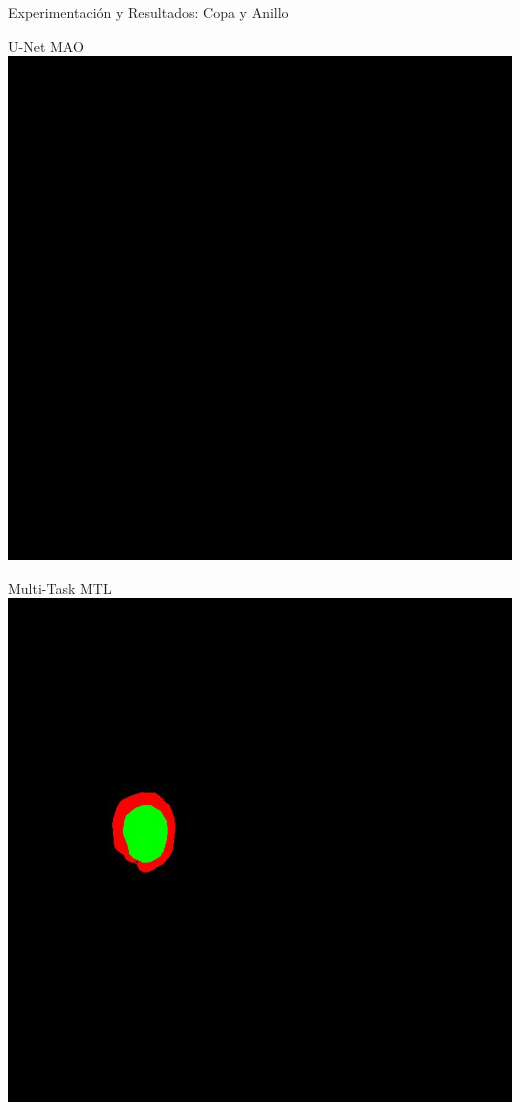 \documentclass[xcolor=dvipsnames,table]{beamer}
\begin{document}
\begin{frame}{Experimentación y Resultados: Copa y Anillo}
\begin{minipage}[b]{0.13\textwidth}
	\end{minipage}\hfill
	\begin{minipage}[b]{0.13\textwidth}
		\centering
		U-Net MAO\\[0.2cm]
		\includegraphics[width=\linewidth]{my_images/video/SOFTUNETMAO.jpg}
	\end{minipage}\hfill
	\begin{minipage}[b]{0.13\textwidth}
		\centering
		Multi-Task MTL\\[0.2cm]
		\includegraphics[width=\linewidth]{my_images/video/HARDTASKMTL.jpg}

\end{minipage}
\end{frame}
\end{document}
